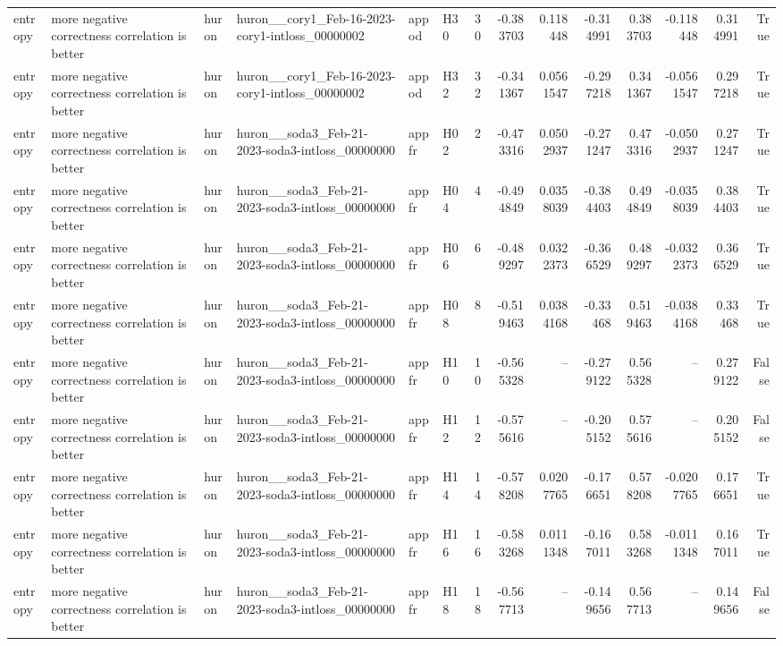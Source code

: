 \begin{longtable}{llllllrrrrrrrr}
entropy & more negative correctness correlation is better & huron & huron\_\_cory1\_Feb-16-2023-cory1-intloss\_00000002 & appod & H30 & 30 & -0.383703 & 0.118448 & -0.314991 & 0.383703 & -0.118448 & 0.314991 & True \\
entropy & more negative correctness correlation is better & huron & huron\_\_cory1\_Feb-16-2023-cory1-intloss\_00000002 & appod & H32 & 32 & -0.341367 & 0.0561547 & -0.297218 & 0.341367 & -0.0561547 & 0.297218 & True \\
entropy & more negative correctness correlation is better & huron & huron\_\_soda3\_Feb-21-2023-soda3-intloss\_00000000 & appfr & H02 & 2 & -0.473316 & 0.0502937 & -0.271247 & 0.473316 & -0.0502937 & 0.271247 & True \\
entropy & more negative correctness correlation is better & huron & huron\_\_soda3\_Feb-21-2023-soda3-intloss\_00000000 & appfr & H04 & 4 & -0.494849 & 0.0358039 & -0.384403 & 0.494849 & -0.0358039 & 0.384403 & True \\
entropy & more negative correctness correlation is better & huron & huron\_\_soda3\_Feb-21-2023-soda3-intloss\_00000000 & appfr & H06 & 6 & -0.489297 & 0.0322373 & -0.366529 & 0.489297 & -0.0322373 & 0.366529 & True \\
entropy & more negative correctness correlation is better & huron & huron\_\_soda3\_Feb-21-2023-soda3-intloss\_00000000 & appfr & H08 & 8 & -0.519463 & 0.0384168 & -0.33468 & 0.519463 & -0.0384168 & 0.33468 & True \\
entropy & more negative correctness correlation is better & huron & huron\_\_soda3\_Feb-21-2023-soda3-intloss\_00000000 & appfr & H10 & 10 & -0.565328 & -- & -0.279122 & 0.565328 & -- & 0.279122 & False \\
entropy & more negative correctness correlation is better & huron & huron\_\_soda3\_Feb-21-2023-soda3-intloss\_00000000 & appfr & H12 & 12 & -0.575616 & -- & -0.205152 & 0.575616 & -- & 0.205152 & False \\
entropy & more negative correctness correlation is better & huron & huron\_\_soda3\_Feb-21-2023-soda3-intloss\_00000000 & appfr & H14 & 14 & -0.578208 & 0.0207765 & -0.176651 & 0.578208 & -0.0207765 & 0.176651 & True \\
entropy & more negative correctness correlation is better & huron & huron\_\_soda3\_Feb-21-2023-soda3-intloss\_00000000 & appfr & H16 & 16 & -0.583268 & 0.0111348 & -0.167011 & 0.583268 & -0.0111348 & 0.167011 & True \\
entropy & more negative correctness correlation is better & huron & huron\_\_soda3\_Feb-21-2023-soda3-intloss\_00000000 & appfr & H18 & 18 & -0.567713 & -- & -0.149656 & 0.567713 & -- & 0.149656 & False \\

\end{longtable}

